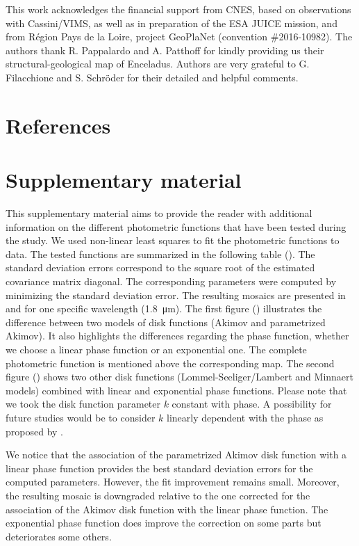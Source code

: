 \documentclass{arxiv-icarus}
\begin{document}
This work acknowledges the financial support from CNES, based on observations with Cassini/VIMS, as well as in preparation of the ESA JUICE mission, and from R\'{e}gion Pays de la Loire, project GeoPlaNet (convention \#2016-10982). The authors thank R. Pappalardo and A. Patthoff for kindly providing us their structural-geological map of Enceladus. Authors are very grateful to G. Filacchione and S. Schr\"{o}der for their detailed and helpful comments.

\vfill\null

\section*{References}




\onecolumn
\appendix
\section{Supplementary material}
\setcounter{figure}{0}

This supplementary material aims to provide the reader with additional information on the different photometric functions that have been tested during the study. We used non-linear least squares to fit the photometric functions to data. The tested functions are summarized in the following table (). The standard deviation errors correspond to the square root of the estimated covariance matrix diagonal. The corresponding parameters were computed by minimizing the standard deviation error. The resulting mosaics are presented in  and  for one specific wavelength (\SI{1.8}{\um}). The first figure () illustrates the difference between two models of disk functions (Akimov and parametrized Akimov). It also highlights the differences regarding the phase function, whether we choose a linear phase function or an exponential one. The complete photometric function is mentioned above the corresponding map. The second figure () shows two other disk functions (Lommel-Seeliger/Lambert and Minnaert models) combined with linear and exponential phase functions.
Please note that we took the disk function parameter $k$ constant with phase. A possibility for future studies would be to consider $k$ linearly dependent with the phase as proposed by \cite{Schroder2017}.

We notice that the association of the parametrized Akimov disk function with a linear phase function provides the best standard deviation errors for the computed parameters. However, the fit improvement remains small. Moreover, the resulting mosaic is downgraded relative to the one corrected for the association of the Akimov disk function with the linear phase function. The exponential phase function does improve the correction on some parts but deteriorates some others.
\end{document}
